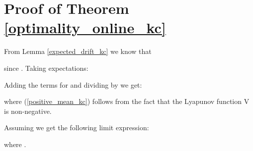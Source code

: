 \documentclass[conference]{IEEEtran}
\begin{document}
\section{Proof of Theorem \ref{optimality_online_kc}}

From Lemma \ref{expected_drift_kc} we know that

since . Taking expectations:


Adding the terms for  and dividing by  we get:

where (\ref{positive_mean_kc}) follows from the fact that the Lyapunov function V is non-negative.

Assuming  we get the following limit expression:

where .\hfill 
\end{document}
